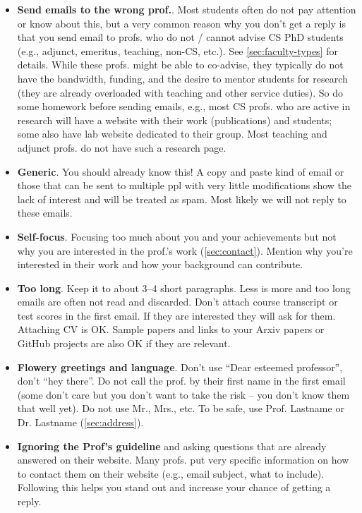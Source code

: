 \documentclass[oneside,11pt,dvipsnames]{book}
\begin{document}
\begin{itemize}
    \item \textbf{Send emails to the wrong prof.}. Most students often do not pay attention or know about this, but a very common reason why you don't get a reply is that you send email to profs. who do not / cannot advise CS PhD students (e.g., adjunct, emeritus, teaching, non-CS, etc.). See \autoref{sec:faculty-types} for details. While these profs. might be able to co-advise, they typically do not have the bandwidth, funding, and the desire to mentor students for research (they are already overloaded with teaching and other service duties). So do some homework before sending emails, e.g., most CS profs. who are active in research will have a website with their work (publications) and students; some also have lab website dedicated to their group. Most teaching and adjunct profs. do not have such a research page.
        
    \item \textbf{Generic}. You should already know this! A copy and paste kind of email or those that can be sent to multiple ppl with very little modifications show the lack of interest and will be treated as spam. Most likely we will not reply to these emails. 

    \item \textbf{Self-focus}. Focusing too much about you and your achievements but not why you are interested in the prof.'s work (\autoref{sec:contact}). Mention why you're interested in their work and how your background can contribute. 

    \item \textbf{Too long}. Keep it to about 3--4 short paragraphs. Less is more and too long emails are often not read and discarded. Don't attach course transcript or test scores in the first email. If they are  interested they will ask for them.  Attaching CV is OK. Sample papers and links to your Arxiv papers or GitHub projects are also OK if they are relevant.
    
    \item \textbf{Flowery greetings and language}. Don't use ``Dear esteemed professor'', don't ``hey there''.  Do not call the prof. by their first name in the first email (some don't care but you don't want to take the risk -- you don't know them that well yet).  Do not use Mr., Mrs., etc. To be safe, use Prof. Lastname or Dr. Lastname (\autoref{sec:address}).
    
    \item \textbf{Ignoring the Prof's guideline} and asking questions that are already answered on their website.  Many profs. put very specific information on how to contact them on their website (e.g., email subject, what to include).  Following this helps you stand out and increase your chance of getting a reply.
    

\end{itemize}
\end{document}
